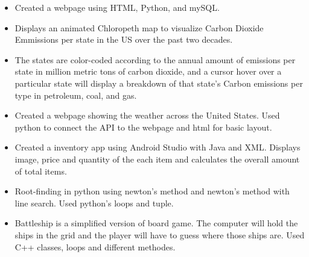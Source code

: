 \documentclass[10pt,a4paper,sans]{moderncv} %
\begin{document}
{}
\begin{itemize}
\vspace{-5mm}
\item{Created a webpage using HTML, Python, and mySQL.}
\item{Displays an animated Chloropeth map to visualize Carbon Dioxide Emmissions per state in the US over the past two decades.}
\item{The states are color-coded according to the annual amount of emissions per state in million metric tons of carbon dioxide, and a cursor hover over a particular state will display a breakdown of that state's Carbon emissions per type in petroleum, coal, and gas.}
\end{itemize}
\begin{itemize}
\vspace{-5mm}
\item{Created a webpage showing the weather across the United States. Used python to connect the API to the webpage and html for basic layout.}
\end{itemize}
{}
\begin{itemize}
\vspace{-5mm}
\item{Created a inventory app using Android Studio with Java and XML. Displays image, price and quantity of the each item and calculates the overall amount of total items.}
\end{itemize}
\begin{itemize}
\vspace{-5mm}
\item{Root-finding in python using newton's method and newton's method with line search. Used python's loops and tuple.}
\end{itemize}
\begin{itemize}
\vspace{-5mm}
\item{Battleship is a simplified version of board game. The computer will hold the ships in the grid and the player will have to guess where those ships are. Used C++ classes, loops and different methodes.}
\end{itemize}
\end{document}
